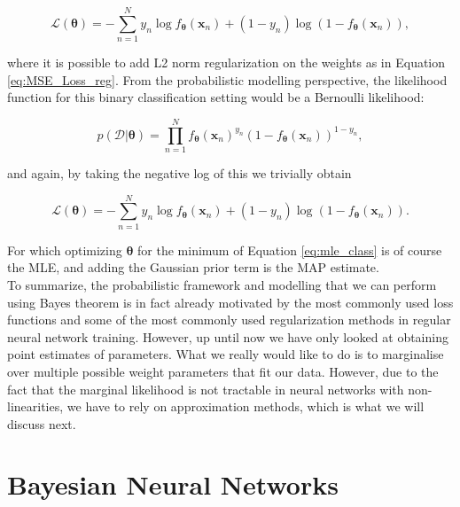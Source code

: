 \begin{equation}
    \mathcal{L}(\bm{\theta})=-\sum^N_{n=1}y_n\log f_{\bm{\theta}}(\mathbf{x}_n)+(1-y_n)\log (1-f_{\bm{\theta}}(\mathbf{x}_n)),
\end{equation}

\noindent where it is possible to add L2 norm regularization on the weights as in Equation \ref{eq:MSE_Loss_reg}. From the probabilistic modelling perspective, the likelihood function for this binary classification setting would be a Bernoulli likelihood:

\begin{equation}
    p(\mathcal{D}|\bm{\theta}) = \prod^N_{n=1}f_{\bm{\theta}}(\mathbf{x}_n)^{y_n}(1-f_{\bm{\theta}}(\mathbf{x}_n))^{1-y_n},
\end{equation}

\noindent and again, by taking the negative log of this we trivially obtain

\begin{equation}
    \mathcal{L}(\bm{\theta})=-\sum^N_{n=1}y_n\log f_{\bm{\theta}}(\mathbf{x}_n)+(1-y_n)\log (1-f_{\bm{\theta}}(\mathbf{x}_n)).
    \label{eq:mle_class}
\end{equation}

\noindent For which optimizing $\bm{\theta}$ for the minimum of Equation \ref{eq:mle_class} is of course the MLE, and adding the Gaussian prior term is the MAP estimate. \\

\noindent To summarize, the probabilistic framework and modelling that we can perform using Bayes theorem is in fact already motivated by the most commonly used loss functions and some of the most commonly used regularization methods in regular neural network training. However, up until now we have only looked at obtaining point estimates of parameters. What we really would like to do is to marginalise over multiple possible weight parameters that fit our data. However, due to the fact that the marginal likelihood is not tractable in neural networks with non-linearities, we have to rely on approximation methods, which is what we will discuss next.

\section{Bayesian Neural Networks}
\label{sec:BNNs}

